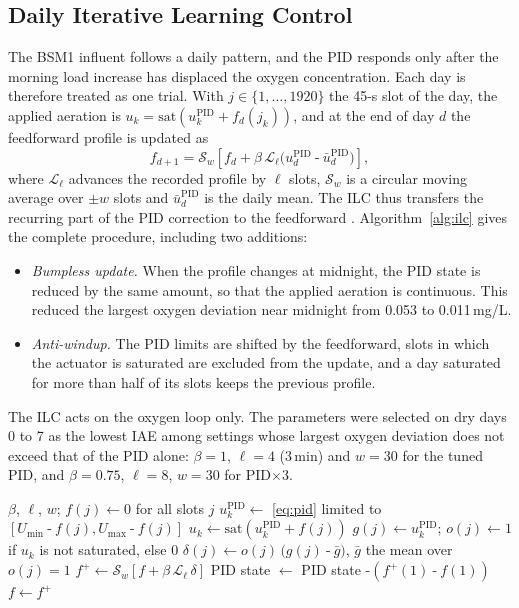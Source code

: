 \documentclass[journal]{IEEEtran}
\newcommand{\mn}{\mathbin{\text{-}}}
\begin{document}
\subsection{Daily Iterative Learning Control}
The BSM1 influent follows a daily pattern, and the PID responds only after
the morning load increase has displaced the oxygen concentration. Each day is
therefore treated as one trial. With $j\in\{1,\dots,1920\}$ the 45-s slot of
the day, the applied aeration is
$u_k=\mathrm{sat}(u^{\mathrm{PID}}_k+f_d(j_k))$, and at the end of day $d$
the feedforward profile is updated as
\begin{equation}
f_{d+1}=\mathcal{S}_w\!\left[f_d+\beta\,\mathcal{L}_\ell\bigl(u^{\mathrm{PID}}_d\mn \bar u^{\mathrm{PID}}_d\bigr)\right],
\label{eq:ilc}
\end{equation}
where $\mathcal{L}_\ell$ advances the recorded profile by $\ell$ slots,
$\mathcal{S}_w$ is a circular moving average over $\pm w$ slots and $\bar
u^{\mathrm{PID}}_d$ is the daily mean. The ILC thus transfers the
recurring part of the PID correction to the feedforward
\cite{gomi1993fel}. Algorithm~\ref{alg:ilc} gives the complete procedure,
including two additions:
\begin{itemize}
\item \emph{Bumpless update.} When the profile changes at midnight, the PID
  state is reduced by the same amount, so that the applied aeration is
  continuous. This reduced the largest oxygen deviation near midnight from
  0.053 to 0.011\,mg/L.
\item \emph{Anti-windup.} The PID limits are shifted by the feedforward,
  slots in which the actuator is saturated are excluded from the update,
  and a day saturated for more than half of its slots keeps the previous
  profile.
\end{itemize}
The ILC acts on the oxygen loop only. The parameters were selected on dry
days 0 to 7 as the lowest IAE among settings whose largest oxygen deviation
does not exceed that of the PID alone: $\beta=1$, $\ell=4$ (3\,min) and
$w=30$ for the tuned PID, and $\beta=0.75$, $\ell=8$, $w=30$ for
PID$\times$3.

\begin{algorithm}[!t]
\caption{Daily ILC with bumpless update and anti-windup}
\label{alg:ilc}
\begin{algorithmic}[1]
\Require $\beta$, $\ell$, $w$; $f(j)\gets0$ for all slots $j$
  \State $u^{\mathrm{PID}}_k\gets$ \eqref{eq:pid} limited to $[U_{\min}\mn f(j),U_{\max}\mn f(j)]$
  \State $u_k\gets\mathrm{sat}(u^{\mathrm{PID}}_k+f(j))$
  \State $g(j)\gets u^{\mathrm{PID}}_k$; $o(j)\gets 1$ if $u_k$ is not saturated, else $0$
    \State $\delta(j)\gets o(j)\,\bigl(g(j)\mn \bar g\bigr)$, $\bar g$ the mean over $o(j)=1$
    \State $f^{+}\gets\mathcal{S}_w[f+\beta\,\mathcal{L}_\ell\,\delta]$
    \State PID state $\gets$ PID state $\mn (f^{+}(1)\mn f(1))$
    \State $f\gets f^{+}$
  \EndIf
\EndFor
\end{algorithmic}
\end{algorithm}
\end{document}
